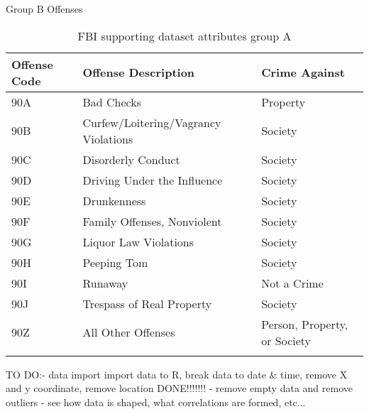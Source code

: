 Group B Offenses
\begin{center}
\begin{longtable}{|m{8em} m{16em} m{7em}|}
    \hline
    Offense Code & 
    Offense Description & 
    Crime Against\\
    \hline
    90A & 
    Bad Checks & 
    Property\\
    \hline
    90B & 
    Curfew/Loitering/Vagrancy Violations & 
    Society\\
    \hline
    90C & 
    Disorderly Conduct & 
    Society\\
    \hline
    90D & 
    Driving Under the Influence & 
    Society\\
    \hline
    90E & 
    Drunkenness & 
    Society\\
    \hline
    90F & 
    Family Offenses, Nonviolent & 
    Society\\
    \hline
    90G & 
    Liquor Law Violations & 
    Society\\
    \hline
    90H & 
    Peeping Tom & 
    Society\\
    \hline
    90I & 
    Runaway & 
    Not a Crime\\
    \hline
    90J & 
    Trespass of Real Property & 
    Society\\
    \hline
    90Z & 
    All Other Offenses & 
    Person, Property, or Society\\
    \hline
\caption{FBI supporting dataset attributes group A}
\end{longtable}
\end{center}



TO DO:- data import \newline
import data to R, break data to date \& time, remove X and y coordinate, remove location\newline
DONE!!!!!!! - remove empty data and remove outliers - see how data is shaped, what correlations are formed, etc... \newline
